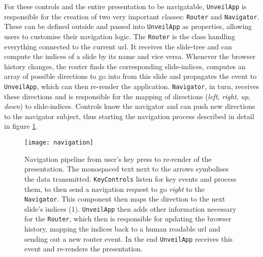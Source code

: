 For these controls and the entire presentation to be navigatable, \texttt{Un\-veil\-App} is responsible for the creation of two very important classes: \texttt{Router} and \texttt{Navigator}. These can be defined outside and passed into \texttt{UnveilApp} as properties, allowing users to customise their navigation logic.
%
The \texttt{Router} is the class handling everything connected to the current url. It receives the slide-tree and can compute the indices of a slide by its name and vice versa. Whenever the browser history changes, the router finds the corresponding slide-indices, computes an array of possible directions to go into from this slide and propagates the event to \texttt{UnveilApp}, which can then re-render the application.
\texttt{Navigator}, in turn, receives these directions and is responsible for the mapping of directions (\emph{left}, \emph{right}, \emph{up}, \emph{down}) to slide-indices. Controls know the navigator and can push new directions to the navigator subject, thus starting the navigation process described in detail in figure \ref{fig:implementation-technologies-unveil-navigation}.

\begin{figure}
\centering
\texttt{[image: navigation]}
\caption{Navigation pipeline from user's key press to re-render of the presentation. The monospaced text next to the arrows symbolises the data transmitted. \texttt{KeyControls} listen for key events and process them, to then send a navigation request to go \emph{right} to the \texttt{Navigator}. This component then maps the direction to the next slide's indices ($1$). \texttt{UnveilApp} then adds other information necessary for the \texttt{Router}, which then is responsible for updating the browser history, mapping the indices back to a human readable url and sending out a new router event. In the end \texttt{UnveilApp} receives this event and re-renders the presentation.}
\label{fig:implementation-technologies-unveil-navigation}
\end{figure}


